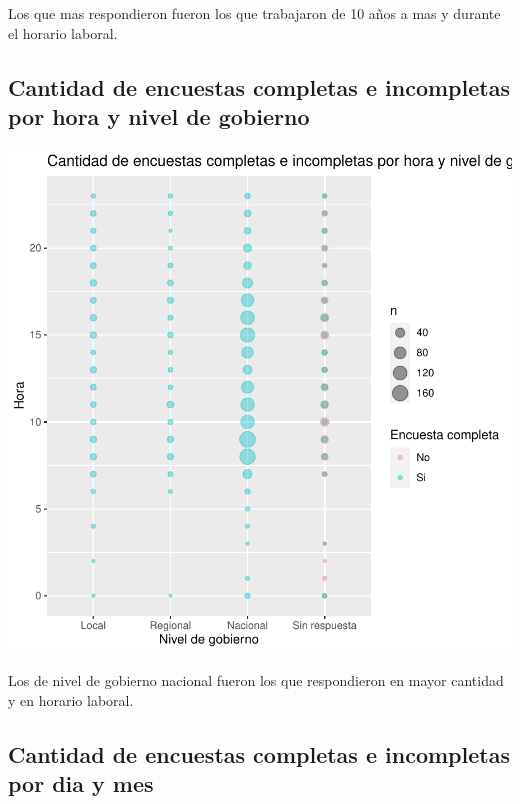 \documentclass{article}
\begin{document}
Los que mas respondieron fueron los que trabajaron de 10 años a mas y durante el horario laboral.

\subsection{Cantidad de encuestas completas e incompletas por hora y nivel de gobierno}

\includegraphics{seguimientov3-045}

Los de nivel de gobierno nacional fueron los que respondieron en mayor cantidad y en horario laboral.

\subsection{Cantidad de encuestas completas e incompletas por dia y mes}
\end{document}
